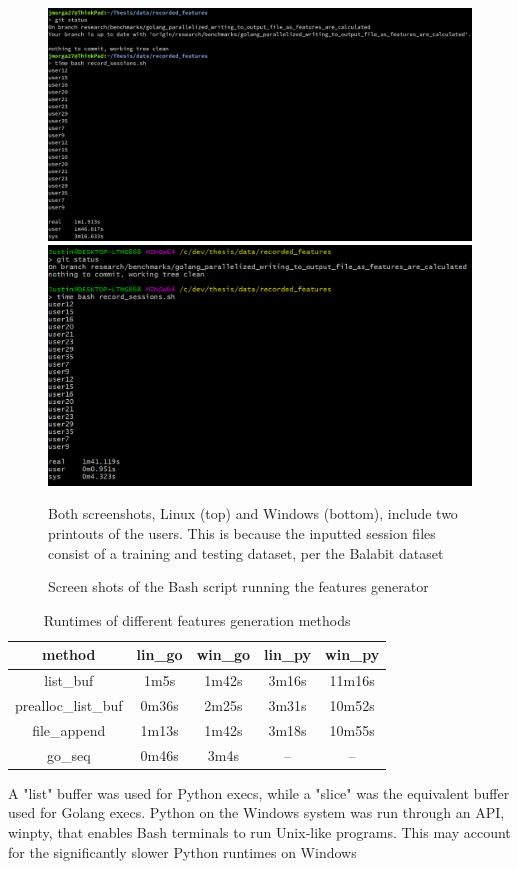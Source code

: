 \begin{figure}
	\centering
	\includegraphics[width=1\columnwidth]{figures/bash_feature_generator_runtime_screenshot_linux}
	\includegraphics[width=1\columnwidth]{figures/bash_feature_generator_runtime_screenshot_windows}
	\caption{Screen shots of the Bash script running the features generator}
	{\small Both screenshots, Linux (top) and Windows (bottom), include two printouts of the users. This is because the inputted session files consist of a training and testing dataset, per the Balabit dataset~\cite{balabit_dataset}}
	\label{fig:bash-features-generator-runtimes}
\end{figure}

\begin{table}[h!]
	\centering
	\begin{tabular}{ |c|c|c|c|c| }
		\hline
		\textbf{method} & \textbf{lin{\_}go} & \textbf{win{\_}go} & \textbf{lin{\_}py} & \textbf{win{\_}py} \\
		\hline
		list{\_}buf & 1m5s & 1m42s & 3m16s & 11m16s \\
		prealloc{\_}list{\_}buf & 0m36s & 2m25s & 3m31s & 10m52s \\
		file{\_}append & 1m13s & 1m42s & 3m18s & 10m55s \\
		go{\_}seq & 0m46s & 3m4s & -- & -- \\
		\hline
	\end{tabular}
	\caption{Runtimes of different features generation methods}
	{\small A "list" buffer was used for Python execs, while a "slice" was the equivalent buffer used for Golang execs. Python on the Windows system was run through an API, winpty, that enables Bash terminals to run Unix-like programs. This may account for the significantly slower Python runtimes on Windows}
\end{table}

